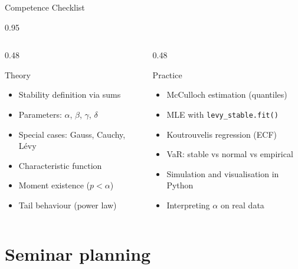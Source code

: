 \documentclass[9pt, aspectratio=169, t]{beamer}
\begin{document}
\begin{frame}{Competence Checklist}
    \begin{cminipage}{0.95\textwidth}
\begin{columns}[T]
\begin{column}{0.48\textwidth}
\begin{block}{Theory}
\begin{itemize}\setlength{\itemsep}{0pt}
    \item[$\square$] Stability definition via sums
    \item[$\square$] Parameters: $\alpha$, $\beta$, $\gamma$, $\delta$
    \item[$\square$] Special cases: Gauss, Cauchy, L\'{e}vy
    \item[$\square$] Characteristic function
    \item[$\square$] Moment existence ($p < \alpha$)
    \item[$\square$] Tail behaviour (power law)
\end{itemize}
\end{block}
\end{column}
\begin{column}{0.48\textwidth}
\begin{block}{Practice}
\begin{itemize}\setlength{\itemsep}{0pt}
    \item[$\square$] McCulloch estimation (quantiles)
    \item[$\square$] MLE with \texttt{levy\_stable.fit()}
    \item[$\square$] Koutrouvelis regression (ECF)
    \item[$\square$] VaR: stable vs normal vs empirical
    \item[$\square$] Simulation and visualisation in Python
    \item[$\square$] Interpreting $\alpha$ on real data
\end{itemize}
\end{block}
\end{column}
\end{columns}
    \end{cminipage}
\end{frame}

\section{Seminar planning}
\end{document}
